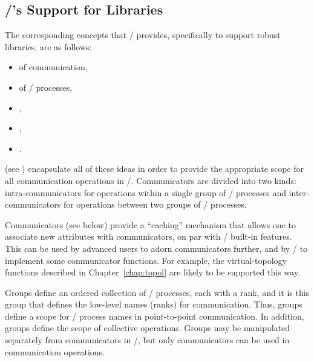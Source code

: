 \subsection{\texorpdfstring{\MPI/}{MPI}'s Support for Libraries}
\label{sec:context:mpilibsupport}
The corresponding
concepts that \MPI/ provides, specifically to support robust libraries, are
as follows:
\begin{itemize} \item {} of communication,
\item {} of \MPI/ processes,
\item {},
\item {},
\item {}.
\end{itemize}
 (see \cite{communicator,zipcode1,Skj93b}) encapsulate all of
these ideas in order to provide the appropriate scope for all communication
operations in \MPI/. Communicators are divided into two kinds:
intra-communicators for operations within a single group of \MPI/ processes and
inter-communicators for operations between two groups of \MPI/
processes.

 Communicators (see
below) provide a ``caching'' mechanism that allows one to
associate new attributes with communicators, on
par with \MPI/ built-in
features. This can be used by advanced users to adorn communicators further,
and by \MPI/ to implement some communicator functions. For example, the
virtual-topology functions described in
Chapter~\ref{chap:topol} are likely to be supported this way.


 Groups
define an ordered collection of \MPI/ processes, each with a rank, and it is this
group that defines the low-level names (ranks) for communication.
Thus, groups define a scope for \MPI/ process
names in point-to-point communication. In addition, groups define the scope
of collective operations. Groups may be manipulated separately from
communicators in \MPI/, but only communicators can be used in
communication operations.

